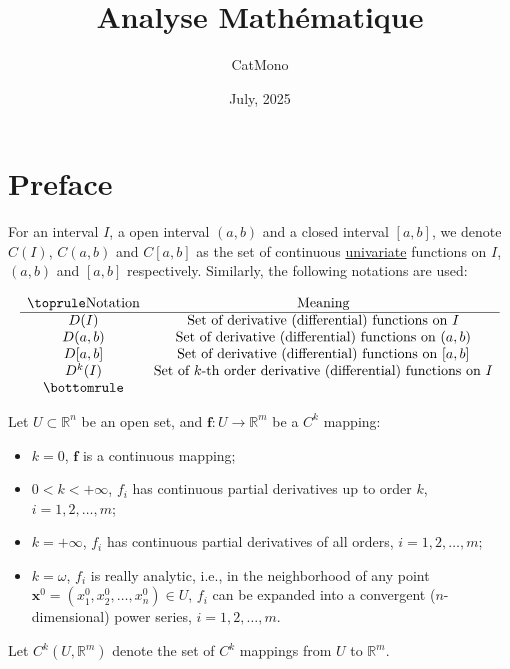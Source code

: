\documentclass[11pt]{../../TexTemplate/elegantbook}
\title{Analyse Mathématique} %
\author{CatMono} %
\date{July, 2025} %
\begin{document}
\maketitle %

\frontmatter        %
\tableofcontents    %

\chapter{Preface}   %
For an interval \(I\), a open interval \((a, b)\) and a closed interval \([a, b]\),
we denote \(C(I)\), \(C(a, b)\) and \(C[a, b]\)
as the set of continuous \underline{univariate} functions on \(I\), \((a, b)\) and \([a, b]\) respectively.
Similarly, the following notations are used:

\[
\begin{array}{cc}
\toprule
\text{Notation} & \text{Meaning} \\
\hline
D(I) & \text{Set of derivative (differential) functions on } I \\
D(a, b) & \text{Set of derivative (differential) functions on } (a, b) \\
D[a, b] & \text{Set of derivative (differential) functions on } [a, b] \\
D^{k}(I) & \text{Set of } k\text{-th order derivative (differential) functions on } I \\
\bottomrule
\end{array}
\]

Let \(U \subset \mathbb{R}^n\) be an open set, and \(\mathbf{f}: U \to \mathbb{R}^m\) be a \(C^k\) mapping:  
\begin{itemize}
    \item \(k = 0\), \(\mathbf{f}\) is a continuous mapping;
    \item \(0 < k < +\infty\), \(f_i\) has continuous partial derivatives up to order \(k\), \(i = 1, 2, \dots, m\);
    \item \(k = +\infty\), \(f_i\) has continuous partial derivatives of all orders, \(i = 1, 2, \dots, m\);
    \item \(k = \omega\), \(f_i\) is really analytic, i.e., 
        in the neighborhood of any point \(\mathbf{x}^0 = (x_1^0, x_2^0, \dots, x_n^0) \in U\), 
        \(f_i\) can be expanded into a convergent (\(n\)-dimensional) power series, \(i = 1, 2, \dots, m\).
\end{itemize}
Let \(C^k(U, \mathbb{R}^m)\) denote the set of \(C^k\) mappings from \(U\) to \(\mathbb{R}^m\).
\end{document}
